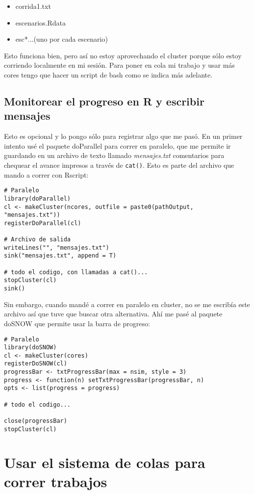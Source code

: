 \documentclass[paper=a4, fontsize=11pt]{scrartcl} %
\numberwithin{equation}{section} %
\numberwithin{figure}{section} %
\numberwithin{table}{section} %
\begin{document}
\begin{itemize}
	\item corrida1.txt
	\item escenarios.Rdata
	\item esc*...(uno por cada escenario)
\end{itemize}

Esto funciona bien, pero así no estoy aprovechando el cluster porque sólo estoy corriendo localmente en mi sesión. Para poner en cola mi trabajo y usar más cores tengo que hacer un script de bash como se indica más adelante.

\subsection{Monitorear el progreso en R y escribir mensajes}

Esto es opcional y lo pongo sólo para registrar algo que me pasó. En un primer intento usé el paquete doParallel para correr en paralelo, que me permite ir guardando en un archivo de texto llamado \textit{mensajes.txt} comentarios para chequear el avance impresos a través de \texttt{cat()}. Esto es parte del archivo que mando a correr con Rscript:

\begin{verbatim}
# Paralelo
library(doParallel)
cl <- makeCluster(ncores, outfile = paste0(pathOutput, "mensajes.txt"))
registerDoParallel(cl)

# Archivo de salida
writeLines("", "mensajes.txt")
sink("mensajes.txt", append = T)

# todo el codigo, con llamadas a cat()...				stopCluster(cl)
sink()
\end{verbatim}

Sin embargo, cuando mandé a correr en paralelo en cluster, no se me escribía este archivo así que tuve que buscar otra alternativa. Ahí me pasé al paquete doSNOW que permite usar la barra de progreso:

\begin{verbatim}
# Paralelo
library(doSNOW)
cl <- makeCluster(cores)
registerDoSNOW(cl)
progressBar <- txtProgressBar(max = nsim, style = 3)
progress <- function(n) setTxtProgressBar(progressBar, n)
opts <- list(progress = progress)

# todo el codigo...

close(progressBar)
stopCluster(cl)
\end{verbatim}

\section{Usar el sistema de colas para correr trabajos}
\end{document}
